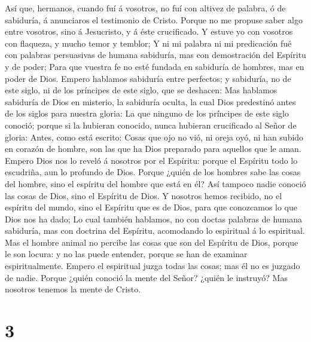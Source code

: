  Así que, hermanos, cuando fuí á vosotros, no fuí con
altivez de palabra, ó de sabiduría, á anunciaros el testimonio de
Cristo.  Porque no me propuse saber algo entre vosotros,
sino á Jesucristo, y á éste crucificado.  Y estuve yo con
vosotros con flaqueza, y mucho temor y temblor;  Y ni mi
palabra ni mi predicación fué con palabras persuasivas de humana
sabiduría, mas con demostración del Espíritu y de poder; 
Para que vuestra fe no esté fundada en sabiduría de hombres, mas en
poder de Dios.  Empero hablamos sabiduría entre perfectos;
y sabiduría, no de este siglo, ni de los príncipes de este siglo, que se
deshacen:  Mas hablamos sabiduría de Dios en misterio, la
sabiduría oculta, la cual Dios predestinó antes de los siglos para
nuestra gloria:  La que ninguno de los príncipes de este
siglo conoció; porque si la hubieran conocido, nunca hubieran
crucificado al Señor de gloria:  Antes, como está escrito:
Cosas que ojo no vió, ni oreja oyó, ni han subido en corazón de hombre,
son las que ha Dios preparado para aquellos que le aman. 
Empero Dios nos lo reveló á nosotros por el Espíritu: porque el Espíritu
todo lo escudriña, aun lo profundo de Dios.  Porque
¿quién de los hombres sabe las cosas del hombre, sino el espíritu del
hombre que está en él? Así tampoco nadie conoció las cosas de Dios, sino
el Espíritu de Dios.  Y nosotros hemos recibido, no el
espíritu del mundo, sino el Espíritu que es de Dios, para que conozcamos
lo que Dios nos ha dado;  Lo cual también hablamos, no
con doctas palabras de humana sabiduría, mas con doctrina del Espíritu,
acomodando lo espiritual á lo espiritual.  Mas el hombre
animal no percibe las cosas que son del Espíritu de Dios, porque le son
locura: y no las puede entender, porque se han de examinar
espiritualmente.  Empero el espiritual juzga todas las
cosas; mas él no es juzgado de nadie.  Porque ¿quién
conoció la mente del Señor? ¿quién le instruyó? Mas nosotros tenemos la
mente de Cristo.

\hypertarget{section-2}{%
\section{3}\label{section-2}}

